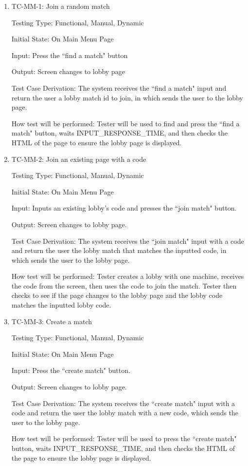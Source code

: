 \documentclass[12pt, titlepage]{article}
\begin{document}
\begin{enumerate}

\item{TC-MM-1: Join a random match}

Testing Type: Functional, Manual, Dynamic
					
Initial State: On Main Menu Page
					
Input: Press the ``find a match" button
					
Output: Screen changes to lobby page

Test Case Derivation: The system receives the ``find a match" input and return the user a lobby match id to join, in which sends the user to the lobby page.
					
How test will be performed: Tester will be used to find and press the ``find a match" button, waits INPUT\_RESPONSE\_TIME, and then checks the HTML of the page to ensure the lobby page is displayed.
					
\item{TC-MM-2: Join an existing page with a code}

Testing Type: Functional, Manual, Dynamic
					
Initial State: On Main Menu Page
					
Input: Inputs an existing lobby's code and presses the ``join match" button.
					
Output: Screen changes to lobby page.

Test Case Derivation: The system receives the ``join match" input with a code and return the user the lobby match that matches the inputted code, in which sends the user to the lobby page.
					
How test will be performed: Tester creates a lobby with one machine, receives the code from the screen, then uses the code to join the match. Tester then checks to see if the page changes to the lobby page and the lobby code matches the inputted lobby code.

\item{TC-MM-3: Create a match}

Testing Type: Functional, Manual, Dynamic 
					
Initial State: On Main Menu Page
					
Input: Press the ``create match" button.
					
Output: Screen changes to lobby page.

Test Case Derivation: The system receives the ``create match" input with a code and return the user the lobby match with a new code, which sends the user to the lobby page.
					
How test will be performed: Tester will be used to press the ``create match" button, waits INPUT\_RESPONSE\_TIME, and then checks the HTML of the page to ensure the lobby page is displayed.

\end{enumerate}
\end{document}
